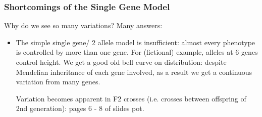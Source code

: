 \documentclass{scrartcl}
\begin{document}
\subsubsection{Shortcomings of the Single Gene Model}
\label{sec:4-2}
Why do we see so many variations? Many answers:
\begin{itemize}
\item The simple single gene/ 2 allele model is insufficient: almost every phenotype is controlled by more than one gene. For (fictional) example, alleles at 6 genes control height.  We get a good old bell curve on distribution: despite Mendelian inheritance of each gene involved, as a result we get a continuous variation from many genes.

  Variation becomes apparent in F2 crosses (i.e. crosses between offspring of 2nd generation): pages 6 - 8 of slides pot.


\end{itemize}
\end{document}
